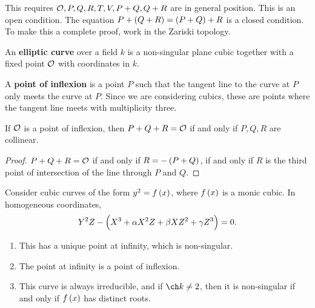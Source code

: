 \begin{remark}
This requires $ \mathcal{O}, P, Q, R, T, V, P + Q, Q + R $ are in general position. This is an open condition. The equation $ P + \br{Q + R} = \br{P + Q} + R $ is a closed condition. To make this a complete proof, work in the Zariski topology.
\end{remark}

\pagebreak


\begin{definition}
An \textbf{elliptic curve} over a field $ k $ is a non-singular plane cubic together with a fixed point $ \mathcal{O} $ with coordinates in $ k $.
\end{definition}

\begin{definition}
A \textbf{point of inflexion} is a point $ P $ such that the tangent line to the curve at $ P $ only meets the curve at $ P $. Since we are considering cubics, these are points where the tangent line meets with multiplicity three.
\end{definition}

\begin{lemma}
If $ \mathcal{O} $ is a point of inflexion, then $ P + Q + R = \mathcal{O} $ if and only if $ P, Q, R $ are collinear.
\end{lemma}

\begin{proof}
$ P + Q + R = \mathcal{O} $ if and only if $ R = -\br{P + Q} $, if and only if $ R $ is the third point of intersection of the line through $ P $ and $ Q $.
\end{proof}

Consider cubic curves of the form $ y^2 = f\br{x} $, where $ f\br{x} $ is a monic cubic. In homogeneous coordinates,
$$ Y^2Z - \br{X^3 + \alpha X^2Z + \beta XZ^2 + \gamma Z^3} = 0. $$

\begin{lemma}
\hfill
\begin{enumerate}
\item This has a unique point at infinity, which is non-singular.
\item The point at infinity is a point of inflexion.
\item This curve is always irreducible, and if $ \ch k \ne 2 $, then it is non-singular if and only if $ f\br{x} $ has distinct roots.
\end{enumerate}
\end{lemma}

